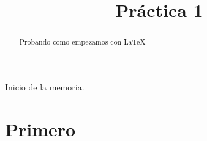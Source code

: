 \documentclass[] {article}
\title{Pr\'actica 1}
\author{}
\begin{document}
\maketitle

\begin{abstract}

Probando como empezamos con \LaTeX{}

\end{abstract}


Inicio de la memoria.

\section{Primero}
\end{document}
